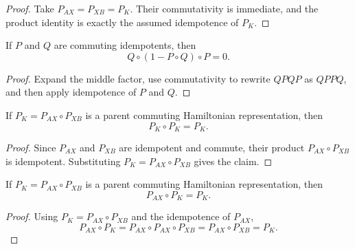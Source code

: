 \begin{proof}
    \leanok
    Take $P_{AX} = P_{XB} = P_K$. Their commutativity is immediate, and the
    product identity is exactly the assumed idempotence of $P_K$.
\end{proof}

\begin{lemma}
    \label{lem:comp_complement_comm_zero}
    \leanok
    If $P$ and $Q$ are commuting idempotents, then
    \[
        Q \circ (1 - P \circ Q) \circ P = 0.
    \]
\end{lemma}

\begin{proof}
    \leanok
    Expand the middle factor, use commutativity to rewrite $QPQP$ as $QPPQ$, and
    then apply idempotence of $P$ and $Q$.
\end{proof}

\begin{theorem}%
    \label{thm:pk_idem}
    \leanok
    If $P_K = P_{AX} \circ P_{XB}$ is a parent commuting Hamiltonian
    representation, then
    \[
        P_K \circ P_K = P_K.
    \]
\end{theorem}

\begin{proof}
    \leanok
    Since $P_{AX}$ and $P_{XB}$ are idempotent and commute, their product
    $P_{AX} \circ P_{XB}$ is idempotent. Substituting
    $P_K = P_{AX} \circ P_{XB}$ gives the claim.
\end{proof}

\begin{theorem}%
    \label{thm:pAX_comp_pK}
    \leanok
    If $P_K = P_{AX} \circ P_{XB}$ is a parent commuting Hamiltonian
    representation, then
    \[
        P_{AX} \circ P_K = P_K.
    \]
\end{theorem}

\begin{proof}
    \leanok
    Using $P_K = P_{AX} \circ P_{XB}$ and the idempotence of $P_{AX}$,
    \[
        P_{AX} \circ P_K
        = P_{AX} \circ P_{AX} \circ P_{XB}
        = P_{AX} \circ P_{XB}
        = P_K.
    \]
\end{proof}

